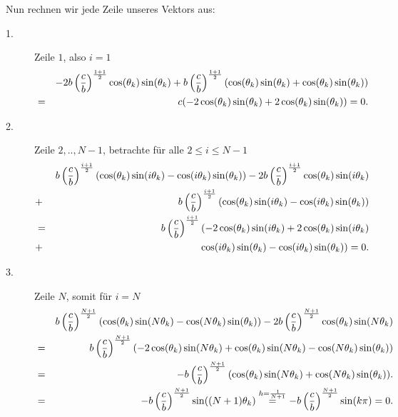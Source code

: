 Nun rechnen wir jede Zeile unseres Vektors aus:

\begin{description}
\item[1.] Zeile $1$, also $i = 1$
\begin{eqnarray}
&& -2b\left(\frac{c}{b}\right)^{\frac{1+1}{2}} \cos(\theta_{k})\sin(\theta_{k}) + b \left(\frac{c}{b}\right)^{\frac{1+1}{2}} (\cos(\theta_{k}) \sin(\theta_{k}) + \cos(\theta_{k}) \sin(\theta_{k})) \notag \\
&=& c (-2\cos(\theta_{k})\sin(\theta_{k}) + 2\cos(\theta_{k})\sin(\theta_{k})) = 0. \notag
\end{eqnarray}
\item[2.] Zeile $2,..,N-1$, betrachte für alle $2 \le i \le N-1$
\begin{eqnarray}
&& b \left(\frac{c}{b}\right)^{\frac{i+1}{2}} (\cos(\theta_{k}) \sin(i \theta_{k}) - \cos(i \theta_{k}) \sin(\theta_{k})) - 2b\left(\frac{c}{b}\right)^{\frac{i+1}{2}} \cos(\theta_{k})\sin(i \theta_{k}) \notag \\
&+& b \left(\frac{c}{b}\right)^{\frac{i+1}{2}} (\cos(\theta_{k}) \sin(i \theta_{k}) - \cos(i \theta_{k}) \sin(\theta_{k})) \notag \\
&=& b \left(\frac{c}{b}\right)^{\frac{i+1}{2}} (-2\cos(\theta_{k})\sin(i\theta_{k}) + 2\cos(\theta_{k})\sin(i\theta_{k}) \notag \\
&+& \cos(i\theta_{k})\sin(\theta_{k}) - \cos(i\theta_{k})\sin(\theta_{k})) = 0. \notag
\end{eqnarray}
\item[3.] Zeile $N$, somit für $i = N$
\begin{eqnarray}
&& b \left(\frac{c}{b}\right)^{\frac{N+1}{2}} (\cos(\theta_{k}) \sin(N \theta_{k}) - \cos(N \theta_{k}) \sin(\theta_{k})) - 2b\left(\frac{c}{b}\right)^{\frac{N+1}{2}} \cos(\theta_{k})\sin(N \theta_{k}) \notag \\
&=& b \left(\frac{c}{b}\right)^{\frac{N+1}{2}}(-2\cos(\theta_{k})\sin(N\theta_{k}) + \cos(\theta_{k})\sin(N\theta_{k}) - \cos(N\theta_{k})\sin(\theta_{k})) \notag \\
&=& -b \left(\frac{c}{b}\right)^{\frac{N+1}{2}}(\cos(\theta_{k})\sin(N\theta_{k}) + \cos(N\theta_{k})\sin(\theta_{k})). \notag \\
&=& -b \left(\frac{c}{b}\right)^{\frac{N+1}{2}} \sin((N+1)\theta_{k}) \overset{h = \frac{1}{N+1}}{=} -b \left(\frac{c}{b}\right)^{\frac{N+1}{2}} \sin(k\pi) = 0. \notag
\end{eqnarray}
\end{description}

